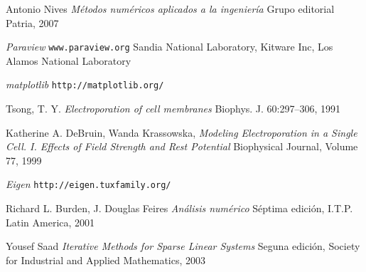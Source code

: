 \begin{thebibliography}{99}
	Antonio Nives
	\emph{Métodos numéricos aplicados a la ingeniería}
	Grupo editorial Patria,
	2007

	\emph{Paraview}
	\texttt{www.paraview.org}
	Sandia National Laboratory, Kitware Inc, Los Alamos National Laboratory

	\emph{matplotlib}
	\texttt{http://matplotlib.org/}
	


	Tsong, T. Y.
	\emph{Electroporation of cell membranes}
	Biophys. J. 60:297–306, 1991

	Katherine A. DeBruin, Wanda Krassowska, 
	\emph{Modeling Electroporation in a Single Cell. I. Effects of Field Strength and
Rest Potential}
	Biophysical Journal, Volume 77, 1999
	
	\emph{Eigen}
	\texttt{http://eigen.tuxfamily.org/}
	
	Richard L. Burden, J. Douglas Feires
	\emph{Análisis numérico}
	Séptima edición, I.T.P. Latin America, 2001

	Yousef Saad
	\emph{Iterative Methods for Sparse Linear Systems}
	Seguna edición, Society for Industrial and Applied Mathematics, 2003
	
\end{thebibliography}
